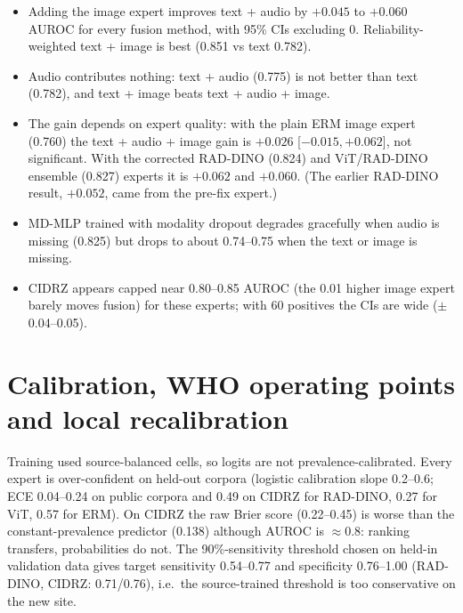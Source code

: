 \documentclass[10pt,a4paper]{article}
\begin{document}
\begin{itemize}
\item Adding the image expert improves text + audio by $+0.045$ to $+0.060$ AUROC for every fusion method, with 95\% CIs excluding 0. Reliability-weighted text + image is best (0.851 vs text 0.782).
\item Audio contributes nothing: text + audio (0.775) is not better than text (0.782), and text + image beats text + audio + image.
\item The gain depends on expert quality: with the plain ERM image expert (0.760) the text + audio + image gain is $+0.026$ [$-0.015,+0.062$], not significant. With the corrected RAD-DINO (0.824) and ViT/RAD-DINO ensemble (0.827) experts it is $+0.062$ and $+0.060$. (The earlier RAD-DINO result, $+0.052$, came from the pre-fix expert.)
\item MD-MLP trained with modality dropout degrades gracefully when audio is missing (0.825) but drops to about 0.74--0.75 when the text or image is missing.
\item CIDRZ appears capped near 0.80--0.85 AUROC (the 0.01 higher image expert barely moves fusion) for these experts; with 60 positives the CIs are wide ($\pm$0.04--0.05).
\end{itemize}

\section{Calibration, WHO operating points and local recalibration}
Training used source-balanced cells, so logits are not prevalence-calibrated. Every expert is over-confident on held-out corpora (logistic calibration slope 0.2--0.6; ECE 0.04--0.24 on public corpora and 0.49 on CIDRZ for RAD-DINO, 0.27 for ViT, 0.57 for ERM). On CIDRZ the raw Brier score (0.22--0.45) is worse than the constant-prevalence predictor (0.138) although AUROC is $\approx$0.8: ranking transfers, probabilities do not. The 90\%-sensitivity threshold chosen on held-in validation data gives target sensitivity 0.54--0.77 and specificity 0.76--1.00 (RAD-DINO, CIDRZ: 0.71/0.76), i.e.\ the source-trained threshold is too conservative on the new site.
\end{document}
